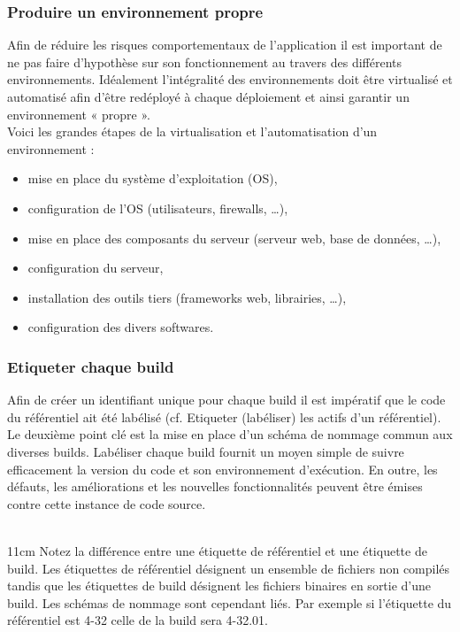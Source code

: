       \subsubsection{Produire un environnement propre}
      Afin de réduire les risques comportementaux de l’application il est important de ne pas faire d’hypothèse sur son fonctionnement au travers des différents environnements. Idéalement l’intégralité des environnements doit être virtualisé et automatisé afin d’être redéployé à chaque déploiement et ainsi garantir un environnement « propre ».\\
      Voici les grandes étapes de la virtualisation et l’automatisation d’un environnement :\\
      \begin{itemize}
        \item mise en place du système d’exploitation (OS),
        \item configuration de l’OS (utilisateurs, firewalls, …),
        \item mise en place des composants du serveur (serveur web, base de données, …),
        \item configuration du serveur,
        \item installation des outils tiers (frameworks web, librairies, …),
        \item	configuration des divers softwares.\\
      \end{itemize}

      \subsubsection{Etiqueter chaque build}
      Afin de créer un identifiant unique pour chaque build il est impératif que le code du référentiel ait été labélisé (cf. Etiqueter (labéliser) les actifs d’un référentiel). Le deuxième point clé est la mise en place d’un schéma de nommage commun aux diverses builds. Labéliser chaque build fournit un moyen simple de suivre efficacement la version du code et son environnement d’exécution. En outre, les défauts, les améliorations et les nouvelles fonctionnalités peuvent être émises contre cette instance de code source.\\\\

      \begin {boxedminipage} {11cm}
        Notez la différence entre une étiquette de référentiel et une étiquette de build. Les étiquettes de référentiel désignent un ensemble de fichiers non compilés tandis que les étiquettes de build désignent les fichiers binaires en sortie d’une build. Les schémas de nommage sont cependant liés. Par exemple si l’étiquette du référentiel est 4-32 celle de la build sera 4-32.01.
      \end {boxedminipage}\\

